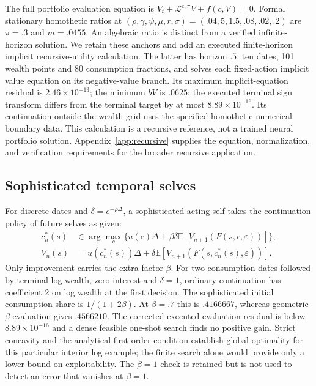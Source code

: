 The full portfolio evaluation equation is $V_t+\mathcal L^{c,\pi}V+f(c,V)=0$. Formal stationary homothetic ratios at $(\rho,\gamma,\psi,\mu,r,\sigma)=(.04,5,1.5,.08,.02,.2)$ are $\pi=.3$ and $m=.0455$. An algebraic ratio is distinct from a verified infinite-horizon solution. We retain these anchors and add an executed finite-horizon implicit recursive-utility calculation. The latter has horizon $.5$, ten dates, 101 wealth points and 80 consumption fractions, and solves each fixed-action implicit value equation on its negative-value branch. Its maximum implicit-equation residual is $2.46\times10^{-13}$; the minimum $bV$ is $.0625$; the executed terminal sign transform differs from the terminal target by at most $8.89\times10^{-16}$. Its continuation outside the wealth grid uses the specified homothetic numerical boundary data. This calculation is a recursive reference, not a trained neural portfolio solution. Appendix~\ref{app:recursive} supplies the equation, normalization, and verification requirements for the broader recursive application.

\subsection{Sophisticated temporal selves}
For discrete dates and $\delta=e^{-\rho\Delta}$, a sophisticated acting self takes the continuation policy of future selves as given:
\begin{align}
c_n^*(s)&\in\arg\max_c\{u(c)\Delta+\beta\delta\mathbb E[V_{n+1}(F(s,c,\varepsilon))]\},\\
V_n(s)&=u(c_n^*(s))\Delta+\delta\mathbb E[V_{n+1}(F(s,c_n^*(s),\varepsilon))].
\label{eq:selves}
\end{align}
Only improvement carries the extra factor $\beta$. For two consumption dates followed by terminal log wealth, zero interest and $\delta=1$, ordinary continuation has coefficient 2 on log wealth at the first decision. The sophisticated initial consumption share is $1/(1+2\beta)$. At $\beta=.7$ this is $.4166667$, whereas geometric-$\beta$ evaluation gives $.4566210$. The corrected executed evaluation residual is below $8.89\times10^{-16}$ and a dense feasible one-shot search finds no positive gain. Strict concavity and the analytical first-order condition establish global optimality for this particular interior log example; the finite search alone would provide only a lower bound on exploitability. The $\beta=1$ check is retained but is not used to detect an error that vanishes at $\beta=1$.

